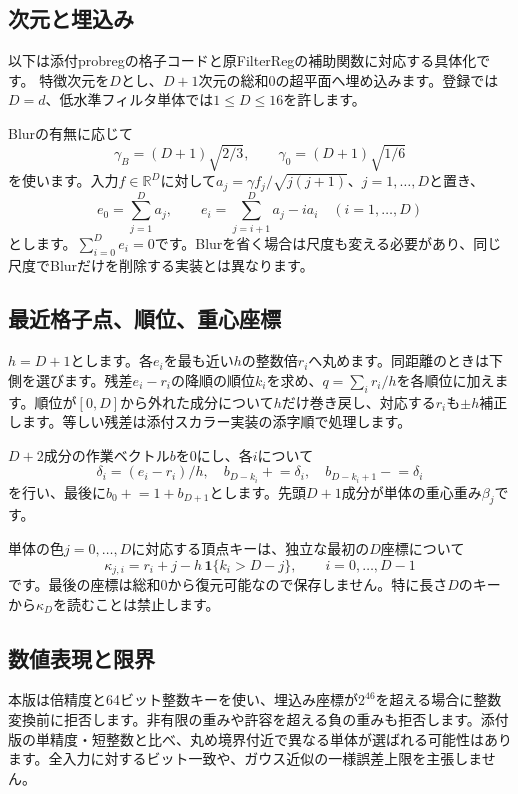 \documentclass[a4paper,11pt]{article}
\newcommand{\R}{\mathbb{R}}
\numberwithin{equation}{section}
\begin{document}
\subsection{次元と埋込み}
以下は添付probregの格子コードと原FilterRegの補助関数に対応する具体化です。\cite{probregsrc,frsrc} 特徴次元を\(D\)とし、\(D+1\)次元の総和0の超平面へ埋め込みます。登録では\(D=d\)、低水準フィルタ単体では\(1\leq D\leq16\)を許します。

Blurの有無に応じて
\begin{equation}
 \gamma_B=(D+1)\sqrt{2/3},\qquad
 \gamma_0=(D+1)\sqrt{1/6}
\end{equation}
を使います。入力\(f\in\R^D\)に対して\(a_j=\gamma f_j/\sqrt{j(j+1)}\)、\(j=1,\ldots,D\)と置き、
\begin{equation}
 e_0=\sum_{j=1}^Da_j,\qquad
 e_i=\sum_{j=i+1}^Da_j-i a_i\quad (i=1,\ldots,D)
\end{equation}
とします。\(\sum_{i=0}^De_i=0\)です。Blurを省く場合は尺度も変える必要があり、同じ尺度でBlurだけを削除する実装とは異なります。

\subsection{最近格子点、順位、重心座標}
\(h=D+1\)とします。各\(e_i\)を最も近い\(h\)の整数倍\(r_i\)へ丸めます。同距離のときは下側を選びます。残差\(e_i-r_i\)の降順の順位\(k_i\)を求め、\(q=\sum_i r_i/h\)を各順位に加えます。順位が\([0,D]\)から外れた成分について\(h\)だけ巻き戻し、対応する\(r_i\)も\(\pm h\)補正します。等しい残差は添付スカラー実装の添字順で処理します。

\(D+2\)成分の作業ベクトル\(b\)を0にし、各\(i\)について
\begin{equation}
 \delta_i=(e_i-r_i)/h,\quad
 b_{D-k_i}\mathrel{+}=\delta_i,\quad
 b_{D-k_i+1}\mathrel{-}=\delta_i
\end{equation}
を行い、最後に\(b_0\mathrel{+}=1+b_{D+1}\)とします。先頭\(D+1\)成分が単体の重心重み\(\beta_j\)です。

単体の色\(j=0,\ldots,D\)に対応する頂点キーは、独立な最初の\(D\)座標について
\begin{equation}
 \kappa_{j,i}=r_i+j-h\,\mathbf1\{k_i>D-j\},\qquad i=0,\ldots,D-1
\end{equation}
です。最後の座標は総和0から復元可能なので保存しません。特に長さ\(D\)のキーから\(\kappa_D\)を読むことは禁止します。

\subsection{数値表現と限界}
本版は倍精度と64ビット整数キーを使い、埋込み座標が\(2^{46}\)を超える場合に整数変換前に拒否します。非有限の重みや許容を超える負の重みも拒否します。添付版の単精度・短整数と比べ、丸め境界付近で異なる単体が選ばれる可能性はあります。全入力に対するビット一致や、ガウス近似の一様誤差上限を主張しません。
\end{document}

